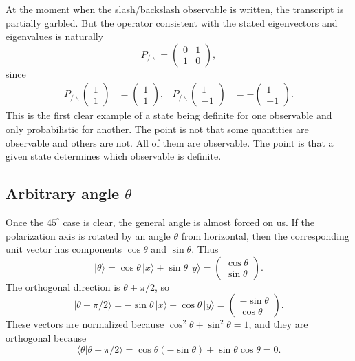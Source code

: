 At the moment when the slash/backslash observable is written, the transcript is partially garbled. But the operator consistent with the stated eigenvectors and eigenvalues is naturally
\begin{equation}
P_{/\backslash}=
\begin{pmatrix}
0&1\\
1&0
\end{pmatrix},
\end{equation}
since
\begin{align}
P_{/\backslash}
\begin{pmatrix}
1\\
1
\end{pmatrix}
&=
\begin{pmatrix}
1\\
1
\end{pmatrix},
&
P_{/\backslash}
\begin{pmatrix}
1\\
-1
\end{pmatrix}
&=
-
\begin{pmatrix}
1\\
-1
\end{pmatrix}.
\end{align}
This is the first clear example of a state being definite for one observable and only probabilistic for another. The point is not that some quantities are observable and others are not. All of them are observable. The point is that a given state determines which observable is definite.

\subsection{Arbitrary angle \(\theta\)}

Once the \(45^\circ\) case is clear, the general angle is almost forced on us. If the polarization axis is rotated by an angle \(\theta\) from horizontal, then the corresponding unit vector has components \(\cos\theta\) and \(\sin\theta\). Thus
\begin{equation}
|\theta\rangle=\cos\theta\,|x\rangle+\sin\theta\,|y\rangle
=
\begin{pmatrix}
\cos\theta\\
\sin\theta
\end{pmatrix}.
\end{equation}
The orthogonal direction is \(\theta+\pi/2\), so
\begin{equation}
|\theta+\pi/2\rangle
=
-\sin\theta\,|x\rangle+\cos\theta\,|y\rangle
=
\begin{pmatrix}
-\sin\theta\\
\cos\theta
\end{pmatrix}.
\end{equation}
These vectors are normalized because \(\cos^2\theta+\sin^2\theta=1\), and they are orthogonal because
\begin{equation}
\langle \theta|\theta+\pi/2\rangle
=
\cos\theta(-\sin\theta)+\sin\theta\cos\theta
=
0.
\end{equation}

